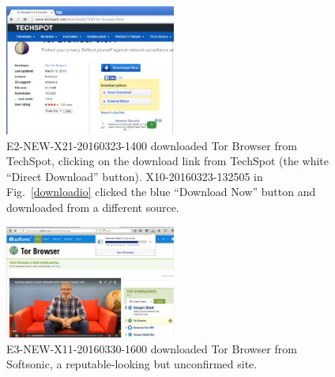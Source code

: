 \documentclass[USenglish,oneside,twocolumn]{article}
\begin{document}
\begin{figure}
\includegraphics[width=0.5\textwidth]{../experiment/processing/bad-participants/20160323-133257-techspot.png}
\caption{E2-NEW-X21-20160323-1400 downloaded Tor Browser from TechSpot, clicking on the download link from 
TechSpot (the white ``Direct Download'' button). X10-20160323-132505 in Fig.~\ref{downloadio} clicked the blue ``Download Now'' button and downloaded from a different source.}
\label{techspot}
\end{figure}

\begin{figure}
\includegraphics[width=0.5\textwidth]{../experiment/processing/bad-participants/20160330-161511-softsonic.png}
\caption{E3-NEW-X11-20160330-1600 downloaded Tor Browser from Softsonic, a reputable-looking but
unconfirmed site.}
\label{softsonic}
\end{figure}
\end{document}
